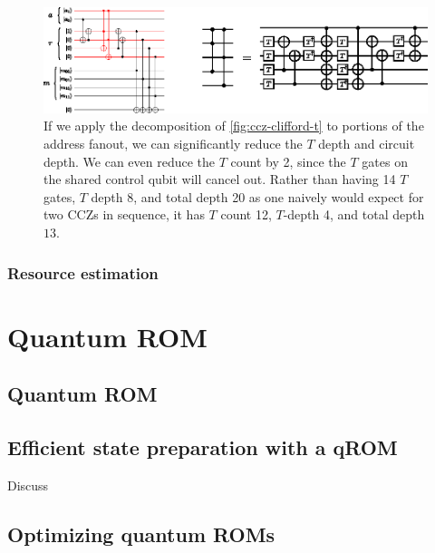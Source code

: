 \documentclass[a4paper,12pt]{article}
\begin{document}
\begin{figure}
 \centering
 \includegraphics[scale=1.5]{images/ccz-simplification}
 \caption{If we apply the decomposition of \autoref{fig:ccz-clifford-t} to portions of the address fanout, we can significantly reduce the $T$ depth and circuit depth. We can even reduce the $T$ count by 2, since the $T$ gates on the shared control qubit will cancel out. Rather than having 14 $T$ gates, $T$ depth 8, and total depth 20 as one naively would expect for two CCZs in sequence, it has $T$ count 12, $T$-depth 4, and total depth $13$.}
 \label{fig:ccz}
\end{figure}


\subsubsection{Resource estimation}



\section{Quantum ROM}
\label{sec:circuits}

\subsection{Quantum ROM}

\subsection{Efficient state preparation with a qROM}

Discuss \cite{Vadym2018}

\subsection{Optimizing quantum ROMs}
\end{document}
